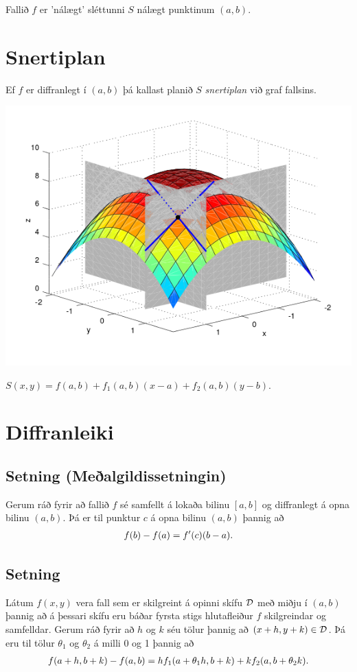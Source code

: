 \documentclass[a4paper,10pt,icelandic]{sphinxmanual}
\begin{document}
Fallið \(f\) er ’nálægt’ sléttunni \(S\) nálægt punktinum
\((a,b)\).


\section{Snertiplan}
\label{Kafli2:index-16}\label{Kafli2:id29}
Ef \(f\) er diffranlegt í \((a,b)\) þá kallast planið \(S\)
\emph{snertiplan} við graf fallsins.

{\hfill\includegraphics[width=0.600\linewidth]{bothpart.png}\hfill}

\(S(x,y) = f(a,b) + f_1(a,b)(x-a)+f_2(a,b)(y-b)\).


\section{Diffranleiki}
\label{Kafli2:id30}

\subsection{Setning (Meðalgildissetningin)}
\label{Kafli2:index-17}\label{Kafli2:setning-mealgildissetningin}
Gerum ráð fyrir að fallið \(f\) sé samfellt á lokaða bilinu
\([a,b]\) og diffranlegt á opna bilinu \((a,b)\). Þá er til
punktur \(c\) á opna bilinu \((a,b)\) þannig að
\begin{gather}
\begin{split}\displaystyle f(b)-f(a)=f'(c)(b-a).\end{split}\notag
\end{gather}

\subsection{Setning}
\label{Kafli2:id31}
Látum \(f(x,y)\) vera fall sem er skilgreint á opinni skífu
\(\cal D\) með miðju í \((a,b)\) þannig að á þessari skífu eru
báðar fyrsta stigs hlutafleiður \(f\) skilgreindar og samfelldar.
Gerum ráð fyrir að \(h\) og \(k\) séu tölur þannig að
\((x+h, y+k)\in{\cal D}\). Þá eru til tölur \(\theta_1\) og
\(\theta_2\) á milli 0 og 1 þannig að
\begin{gather}
\begin{split}\displaystyle f(a+h,b+k)-f(a,b)=hf_1(a+\theta_1h,b+k)+kf_2(a,b+\theta_2k).\end{split}\notag
\end{gather}
\end{document}
